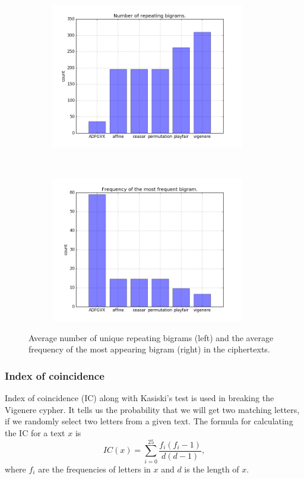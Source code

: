 \documentclass[a4paper]{article}
\begin{document}
\begin{figure}[H]
    \centering
    \begin{subfigure}[h]{0.5\textwidth}
    		\centering
        \includegraphics[height=2.5in]{img/bigrams_1.png}
    \end{subfigure}%
    ~
    \begin{subfigure}[h]{0.5\textwidth}
	    \centering
        \includegraphics[height=2.5in]{img/bigrams_2.png}
    \end{subfigure}
    \caption{Average number of unique repeating bigrams (left) and the average frequency of the most appearing bigram (right) in the ciphertexts.}
    \label{fig:bigrams}
\end{figure}

\subsubsection*{Index of coincidence}
Index of coincidence (IC) along with Kasiski's test is used in breaking the Vigenere cypher. It tells us the probability that we will get two matching letters, if we randomly select two letters from a given text. The formula for calculating the IC for a text $x$ is
$$IC(x) = \sum_{i=0}^{25} \frac{f_{i}(f_{i}-1)}{d(d-1)}, $$
where $f_{i}$ are the frequencies of letters in $x$ and $d$ is the length of $x$.
\end{document}
